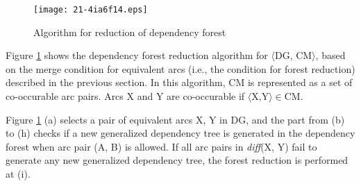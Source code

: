 \documentclass[english]{jnlp_1.4_rep}
\theoremstyle{break}
\theoremstyle{plain}
\theoremstyle{plain}
\begin{document}
\begin{figure}[b]
 \begin{center}
\texttt{[image: 21-4ia6f14.eps]}
 \end{center}
\caption{Algorithm for reduction of dependency forest}
\label{fig:DFReductionAlgorithm}
\end{figure}

Figure \ref{fig:DFReductionAlgorithm} shows the dependency forest
reduction algorithm for $\langle\text{DG, CM}\rangle$, based on the merge condition for
equivalent arcs (i.e., the condition for forest reduction) described
in the previous section. In this algorithm, CM is represented as a set
of co-occurable arc pairs. Arcs X and Y are co-occurable if $\langle\text{X,Y}\rangle \in \mathrm{CM}$.

Figure \ref{fig:DFReductionAlgorithm} (a) selects a pair of equivalent
arcs X, Y in DG, and the part from (b) to (h) checks if a new
generalized dependency tree is generated in the dependency forest when
arc pair (A, B) is allowed. If all arc pairs in \textit{diff}(X, Y) fail to
generate any new generalized dependency tree, the forest reduction is
performed at (i).
\end{document}

